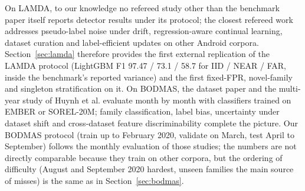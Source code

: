 \documentclass[fleqn,10pt]{wlscirep}
\newcommand{\lgbm}{LightGBM}
\begin{document}
On LAMDA, to our knowledge no refereed study other than the benchmark paper itself reports detector results under its protocol; the closest refereed work addresses pseudo-label noise under drift\cite{qiu2026plcdroid}, regression-aware continual learning\cite{ghiani2026regression}, dataset curation\cite{chow2026tesseract} and label-efficient updates\cite{minnei2025label} on other Android corpora. Section~\ref{sec:lamda} therefore provides the first external replication of the LAMDA protocol (\lgbm{} F1 97.47 / 73.1 / 58.7 for IID / NEAR / FAR, inside the benchmark's reported variance) and the first fixed-FPR, novel-family and singleton stratification on it. On BODMAS, the dataset paper\cite{yang2021bodmas} and the multi-year study of Huynh et al.\cite{huynh2026temporal} evaluate month by month with classifiers trained on EMBER or SOREL-20M; family classification\cite{wang2022measurement,lu2022selfattentive}, label bias\cite{yan2022labelbias}, uncertainty under dataset shift\cite{yumlembam2025uncertainty} and cross-dataset feature discriminability\cite{truong2026crossdataset} complete the picture. Our BODMAS protocol (train up to February 2020, validate on March, test April to September) follows the monthly evaluation of those studies; the numbers are not directly comparable because they train on other corpora, but the ordering of difficulty (August and September 2020 hardest, unseen families the main source of misses) is the same as in Section~\ref{sec:bodmas}.
\end{document}
